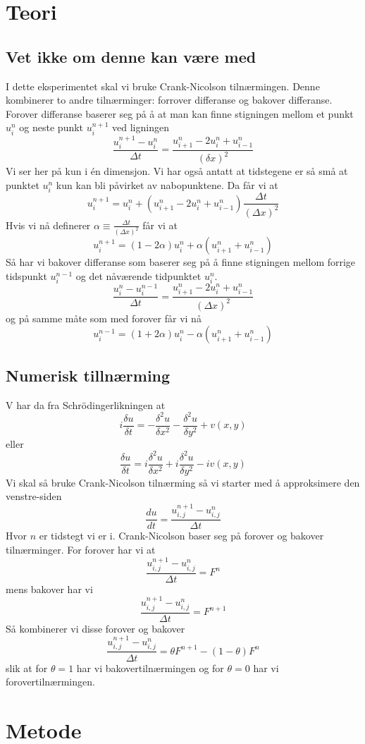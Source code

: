 \documentclass[reprint,english,notitlepage]{revtex4-2}  %
\begin{document}
\section{Teori}   %

\subsection{Vet ikke om denne kan være med}
I dette eksperimentet skal vi bruke Crank-Nicolson tilnærmingen. Denne kombinerer to andre tilnærminger: forrover differanse og bakover differanse.
Forover differanse baserer seg på å at man kan finne stigningen mellom et punkt $u^{n}_i$ og neste punkt $u^{n+1}_{i}$ ved ligningen
$$
\frac{u^{n+1}_{i}-u^n_i}{\Delta t}=\frac{u^n_{i+1}-2u^n_i+u^n_{i-1}}{(\delta x)^2}
$$
Vi ser her på kun i én dimensjon. Vi har også antatt at tidstegene er så små at punktet $u^n_i$ kun kan bli påvirket av nabopunktene. Da får vi at
$$
u^{n+1}_i=u^n_i+(u^n_{i+1}-2u^n_i+u^n_{i-1})\frac{\Delta t}{(\Delta x)^2}
$$
Hvis vi nå definerer $\alpha\equiv \frac{\Delta t}{(\Delta x)^2}$
får vi at
$$
u^{n+1}_i=(1-2\alpha)u^n_i+\alpha(u^n_{i+1}+u^n_{i-1})
$$
Så har vi bakover differanse som baserer seg på å finne stigningen mellom forrige tidspunkt $u^{n-1}_i$ og det nåværende tidpunktet $u^n_i$. 
$$
\frac{u^n_i-u^{n-1}_i}{\Delta t}=\frac{u^n_{i+1}-2u^n_i+u^{n}_{i-1}}{(\Delta x)^2}
$$
og på samme måte som med forover får vi nå
$$
u^{n-1}_i=(1+2\alpha)u^n_i-\alpha(u^n_{i+1}+u^n_{i-1})
$$
\subsection{Numerisk tillnærming} 
V har da fra Schrödingerlikningen at
$$
i\frac{\delta u}{\delta t}=-\frac{\delta^2 u}{\delta x^2}-\frac{\delta^2 u}{\delta y^2}+v(x,y)
$$
eller 
$$
\frac{\delta u}{\delta t}=i\frac{\delta^2 u}{\delta x^2}+i\frac{\delta^2 u}{\delta y^2}-iv(x,y)
$$
Vi skal så bruke Crank-Nicolson tilnærming så vi starter med å approksimere den venstre-siden
$$
\frac{d u}{dt}=\frac{u^{n+1}_{i,j}-u^{n}_{i,j}}{\Delta t}
$$
Hvor $n$ er tidstegt vi er i.
Crank-Nicolson baser seg på forover og bakover tilnærminger. For forover har vi at
$$
\frac{u^{n+1}_{i,j}-u^{n}_{i,j}}{\Delta t}=F^{n}
$$ 
mens bakover har vi
$$
\frac{u^{n+1}_{i,j}-u^{n}_{i,j}}{\Delta t}=F^{n+1}
$$
Så kombinerer vi disse forover og bakover
$$
\frac{u^{n+1}_{i,j}-u^n_{i,j}}{\Delta t}=\theta F^{n+1}-(1-\theta)F^{n}
$$
slik at for $\theta=1$ har vi bakovertilnærmingen og for $\theta=0$ har vi forovertilnærmingen.
\section{Metode}
\end{document}
